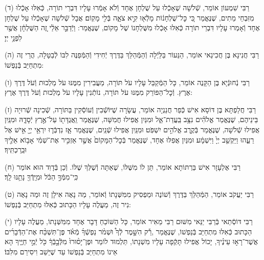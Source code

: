 \documentclass[twoside, openany, parskip=half, 11pt]{book}
\begin{document}
(ד)
רַבִּי שִׁמְעוֹן אוֹמֵר, שְֿׁלֹשָׁה שֶׁאָכְֿלוּ עַל שֻׁלְחָן אֶחָד וְֿלֹא אָמְֿרוּ עָלָיו דִּבְרֵי תוֹרָה, כְּֿאִלּוּ אָכְֿלוּ מִזִּבְחֵי מֵתִים, שֶׁנֶּאֱמַר כִּ֚י כׇּל־שֻׁלְחָנ֔וֹת מָלְֿא֖וּ קִ֣יא צֹאָ֑ה בְּֿלִ֖י מָקֽוֹם׃ אֲבָל שְֿׁלשָׁה שֶׁאָכְֿלוּ עַל שֻׁלְחָן אֶחָד וְֿאָמְרוּ עָלָיו דִּבְרֵי תוֹרָה כְּֿאִלּוּ אָכְֿלוּ מִשֻּׁלְחָנוֹ שֶׁל מָקוֹם, שֶׁנֶּאֱמַר: וַיְֿדַבֵּ֣ר אֵלַ֔י זֶ֚ה הַשֻּׁלְחָ֔ן אֲשֶׁ֖ר לִפְנֵ֥י יְיָ׃



(ה)
רַבִּי חֲנִינָא בֶּן חֲכִינַאי אוֹמֵר, הַנֵּעוֹר בַּלַּיְֿלָה וְֿהַמְּֿהַלֵּךְ בַּדֶּרֶךְ יְֿחִידִי וְֿהַמְּֿפַנֶּה לִבּוֹ לְֿבַטָּלָה,
הֲרֵי זֶה מִתְחַיֵּב בְּֿנַפְשׁוֹ:

(ו)
רַבִּי נְֿחוּנְֿיָא בֶּן הַקָּנֶה אוֹמֵר, כָּל הַמְּֿקַבֵּל עָלָיו עֹל תּוֹרָה, מַעֲבִירִין מִמֶּנּוּ עֹל מַלְכוּת וְֿעֹל דֶּרֶךְ אֶרֶץ.
וְֿכׇל־הַפּוֹרֵק מִמֶּנּוּ עֹל תּוֹרָה, נוֹתְֿנִין עָלָיו עֹל מַלְכוּת וְֿעֹל דֶּרֶךְ אֶרֶץ:

(ז)
רַבִּי חֲלַפְתָּא בֶּן דּוֹסָא אִישׁ כְּֿפַר חֲנַנְיָה אוֹמֵר, עֲשָׂרָה שֶׁיּוֹשְֿֿׁבִין וְֿעוֹסְֿקִין בַּתּוֹרָה, שְֿׁכִינָה שְֿׁרוּיָה בֵּינֵיהֶם, שֶׁנֶּאֱמַר אֱלֹהִ֗ים נִצָּ֥ב בַּֽעֲדַת־אֵ֑ל וּמִנַּיִן אֲפִילוּ חֲמִשָּׁה, שֶׁנֶּאֱמַר וַֽאֲגֻדָּת֖וֹ עַל־אֶ֣רֶץ יְֿסָדָ֑הּ וּמִנַּֽיִן אֲפִילוּ שְֿׁלֹשָׁה, שֶׁנֶּאֱמַר בְּֿקֶ֖רֶב אֱלֹהִ֣ים יִשְׁפֹּֽט׃ וּמִנַּֽיִן אֲפִילוּ שְֿׁנַֽיִם, שֶׁנֶּאֱמַר אָ֧ז נִדְבְּֿר֛וּ יִרְאֵ֥י יְיָ֖ אִ֣ישׁ אֶל רֵעֵ֑הוּ וַיַּקְשֵׁ֤ב יְיָ֙ וַיִּשְׁמָ֔ע׃
וּמִנַּיִן אֲפִלּוּ אֶחָד, שֶׁנֶּאֱמַר בְּֿכׇל־הַמָּקוֹם֙ אֲשֶׁ֣ר אַזְכִּ֣יר אֶת־שְׁמִ֔י אָב֥וֹא אֵלֶ֖יךָ וּבֵֽרַכְתִּֽיךָ׃


(ח)
רַבִּי אֶלְעָזָר אִישׁ בַּרְתּוֹתָא אוֹמֵר, תֵּן לוֹ מִשֶּׁלּוֹ, שֶׁאַתָּה וְֿשֶׁלְּךָ שֶׁלּוֹ.
וְֿכֵן בְּֿדָוִד הוּא אוֹמֵר כִּֽי־מִמְּֿךָ֣ הַכֹּ֔ל וּמִיָּֽדְֿךָ֖ נָתַ֥נּוּ לָֽךְ׃

(ט)
רַבִּי יַעֲקֹב אוֹמֵר, הַמְּֿהַלֵּךְ בַּדֶּרֶךְ וְֿשׁוֹנֶה וּמַפְסִיק מִמִּשְּׁנָתוֹ וְֿאוֹמֵר, מַה נָאֶה אִילָן זֶה וּמַה נָאֶה נִיר זֶה, מַעֲלֶה עָלָיו הַכָּתוּב כְּֿאִלּוּ מִתְחַיֵּב בְּֿנַפְשׁוֹ:

(י)
רַבִּי דּוֹסְֿתַאי בְּֿרַבִּי יַנַּאי מִשּׁוּם רַבִּי מֵאִיר אוֹמֵר, כָּל הַשּׁוֹכֵחַ דָּבָר אֶחָד מִמִּשְּׁנָתוֹ, מַעֲלֶה עָלָיו הַכָּתוּב כְּֿאִלּוּ מִתְחַיֵּב בְּֿנַפְשׁוֹ, שֶׁנֶּאֱמַר ,רַ֡ק הִשָּׁ֣מֶר לְֿךָ֩ וּשְׁמֹ֨ר נַפְשְֿׁךָ֜ מְֿאֹ֗ד פֶּן־תִּשְׁכַּ֨ח אֶת־הַדְּֿבָרִ֜ים אֲשֶׁר־רָא֣וּ עֵינֶ֗יךָ, יָכוֹל אֲפִילוּ תָּקְֿפָה עָלָיו מִשְׁנָתוֹ, תַּלְמוּד לוֹמַר וּפֶן־יָס֨וּרוּ֙ מִלְּֿבָ֣בְֿךָ֔ כֹּ֖ל יְֿמֵ֣י חַיֶּ֑יךָ הָא אֵינוֹ מִתְחַיַּב בְּֿנַפְשׁוֹ עַד שֶׁיֵּשֵׁב וִיסִירֵם מִלִּבּוֹ׃
\end{document}
